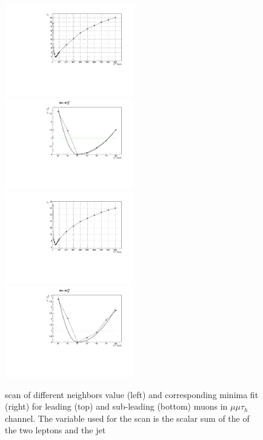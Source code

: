 \begin{figure}
\includegraphics[width=0.5\textwidth]{4_Analisys/pics/8TeV/ProfileNeighbors/MM/h2taucuts/LT_chi2.pdf}
\includegraphics[width=0.5\textwidth]{4_Analisys/pics/8TeV/ProfileNeighbors/MM/h2taucuts_LT.pdf} \\
\includegraphics[width=0.5\textwidth]{4_Analisys/pics/8TeV/ProfileNeighbors/MM/h2taucuts020/LT_chi2.pdf}
\includegraphics[width=0.5\textwidth]{4_Analisys/pics/8TeV/ProfileNeighbors/MM/h2taucuts020_LT.pdf} \\
\caption{\chisq scan of different neighbors value (left) and corresponding minima fit (right) for leading (top) and sub-leading (bottom) muons in $\mu\mu\tau_h$ channel. The variable used for the scan is the scalar sum of the \pT of the two leptons and the jet}
\label{fig:kNN_minima_MMT}
\end{figure}

